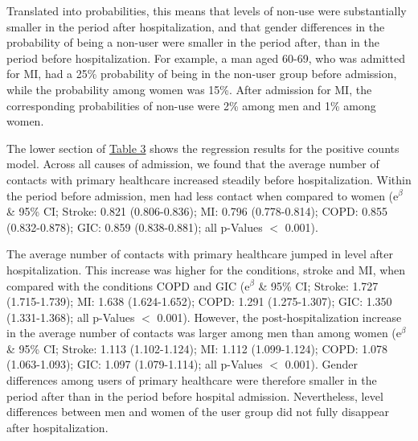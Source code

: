 Translated into probabilities, this means that levels of non-use were substantially 
smaller in the period after hospitalization, and that gender differences in 
the probability of being a non-user were smaller in the period after, than 
in the period before hospitalization. For example, a man aged 60-69, who 
was admitted for MI, had a 25\% probability of being in the non-user group 
before admission, while the probability among women was 15\%. After admission 
for MI, the corresponding probabilities of non-use were 2\% among men and 1\% 
among women.

The lower section of \hyperref[ch3:tab3]{Table 3} shows the regression results for the positive 
counts model. Across all causes of admission, we found that the average 
number of contacts with primary healthcare increased steadily before 
hospitalization. Within the period before admission, men had less contact 
when compared to women ($\mathrm{e}^\beta$ \& 95\% CI; Stroke: 0.821 
(0.806-0.836); MI: 0.796 (0.778-0.814); COPD: 0.855 (0.832-0.878); GIC: 
0.859 (0.838-0.881); all p-Values $<$ 0.001).

The average number of contacts with primary healthcare jumped in level 
after hospitalization. This increase was higher for the conditions, stroke 
and MI, when compared with the conditions COPD and GIC ($\mathrm{e}^\beta$ 
\& 95\% CI; Stroke: 1.727 (1.715-1.739); MI: 1.638 (1.624-1.652); COPD: 
1.291 (1.275-1.307); GIC: 1.350 (1.331-1.368); all p-Values $<$ 0.001). 
However, the post-hospitalization increase in the average number of contacts 
was larger among men than among women ($\mathrm{e}^\beta$ \& 95\% CI; Stroke: 
1.113 (1.102-1.124); MI: 1.112 (1.099-1.124); COPD: 1.078 (1.063-1.093); 
GIC: 1.097 (1.079-1.114); all p-Values $<$ 0.001). Gender differences 
among users of primary healthcare were therefore smaller in the period 
after than in the period before hospital admission. Nevertheless, level 
differences between men and women of the user group did not fully disappear 
after hospitalization.



